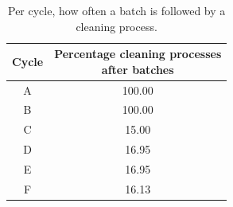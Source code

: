 \documentclass[../Thesis.tex]{subfiles}
\begin{document}
\begin{table}[ht]
    \centering
    \begin{tabular}{c|c}
        Cycle & \makecell{Percentage cleaning processes\\ after batches} \\ \hline
        A     & 100.00      \\
        B     & 100.00      \\
        C     & 15.00       \\
        D     & 16.95       \\
        E     & 16.95       \\
        F     & 16.13
    \end{tabular}
    \caption{Per cycle, how often a batch is followed by a cleaning process.}
    \label{tab:cycle cleaning prob}
\end{table}











\end{document}
